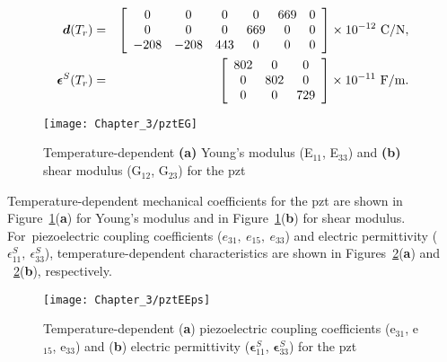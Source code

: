 \begin{eqnarray}
	\boldsymbol{d}(T_r) & = & \left[
	\begin{array}{cccccc}
	0 & 0 & 0 & 0 & 669 & 0\\
	0 & 0 & 0 & 669 & 0 & 0\\
	-208 & -208 & 443 & 0 & 0 & 0
	\end{array}\right] \times10^{-12}\ \unit[per-mode = symbol]{\coulomb\per\newton},\\
	\boldsymbol{\epsilon}^S(T_r) & = & \left[
	\begin{array}{ccc}
	802 & 0 & 0\\
	0 & 802 & 0\\
	0 & 0 & 729
\end{array}\right] \times10^{-11}\ \unit[per-mode = symbol]{\farad\per\meter}.
\end{eqnarray}

\begin{figure}[!tbh]
	\begin{center}
		\texttt{[image: Chapter\_3/pztEG]}
	\end{center}
	\caption{Temperature-dependent \textbf{(a)} Young's modulus (E\(_{11}\), E\(_{33}\)) and \textbf{(b)} shear modulus (G\(_{12}\), G\(_{23}\)) for the \acs{pzt}}
	\label{fig:pztEG}
\end{figure}

Temperature-dependent mechanical coefficients for the \ac{pzt} are shown in Figure~\ref{fig:pztEG}(\textbf{a}) for Young's modulus and in Figure~\ref{fig:pztEG}(\textbf{b}) for shear modulus.
For~piezoelectric coupling coefficients (\(e_{31},\ e_{15},\ e_{33}\)) and electric permittivity (\(\epsilon^S_{11},\  \epsilon^S_{33}\)), temperature-dependent characteristics are shown in Figures~\ref{fig:pztEEps}(\textbf{a}) and ~\ref{fig:pztEEps}(\textbf{b}), respectively.


\begin{figure}[!tbh]
	\begin{center}
		\texttt{[image: Chapter\_3/pztEEps]}
	\end{center}
	\caption{Temperature-dependent (\textbf{a}) piezoelectric coupling coefficients (e\(_{31}\), e\(_{15}\), e\(_{33}\)) and (\textbf{b}) electric permittivity (\(\boldsymbol{\epsilon}^S_{11}\), \(\boldsymbol{\epsilon}^S_{33}\)) for the \acs{pzt}}
	\label{fig:pztEEps}
\end{figure}
